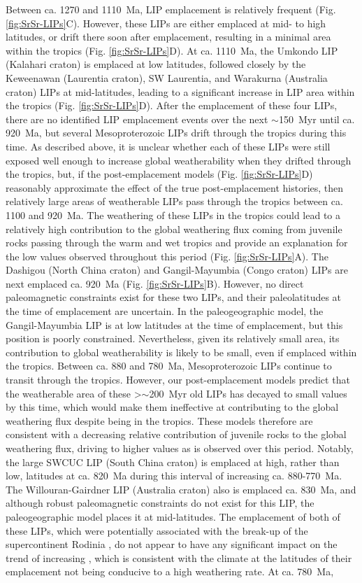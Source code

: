 Between ca. 1270 and 1110~Ma, LIP emplacement is relatively frequent (Fig. \ref{fig:SrSr-LIPs}C). However, these LIPs are either emplaced at mid- to high latitudes, or drift there soon after emplacement, resulting in a minimal area within the tropics (Fig. \ref{fig:SrSr-LIPs}D). At ca. 1110~Ma, the Umkondo LIP (Kalahari craton) is emplaced at low latitudes, followed closely by the Keweenawan (Laurentia craton), SW Laurentia, and Warakurna (Australia craton) LIPs at mid-latitudes, leading to a significant increase in LIP area within the tropics (Fig. \ref{fig:SrSr-LIPs}D). After the emplacement of these four LIPs, there are no identified LIP emplacement events over the next $\sim$150~Myr until ca. 920~Ma, but several Mesoproterozoic LIPs drift through the tropics during this time. As described above, it is unclear whether each of these LIPs were still exposed well enough to increase global weatherability when they drifted through the tropics, but, if the post-emplacement models (Fig. \ref{fig:SrSr-LIPs}D) reasonably approximate the effect of the true post-emplacement histories, then relatively large areas of weatherable LIPs pass through the tropics between ca. 1100 and 920~Ma. The weathering of these LIPs in the tropics could lead to a relatively high contribution to the global weathering flux coming from juvenile rocks passing through the warm and wet tropics and provide an explanation for the low \SrSr values observed throughout this period (Fig. \ref{fig:SrSr-LIPs}A). The Dashigou (North China craton) and Gangil-Mayumbia (Congo craton) LIPs are next emplaced ca. 920~Ma (Fig. \ref{fig:SrSr-LIPs}B). However, no direct paleomagnetic constraints exist for these two LIPs, and their paleolatitudes at the time of emplacement are uncertain. In the paleogeographic model, the Gangil-Mayumbia LIP is at low latitudes at the time of emplacement, but this position is poorly constrained. Nevertheless, given its relatively small area, its contribution to global weatherability is likely to be small, even if emplaced within the tropics. Between ca. 880 and 780~Ma, Mesoproterozoic LIPs continue to transit through the tropics. However, our post-emplacement models predict that the weatherable area of these \textgreater$\sim$200~Myr old LIPs has decayed to small values by this time, which would make them ineffective at contributing to the global weathering flux despite being in the tropics. These models therefore are consistent with a decreasing relative contribution of juvenile rocks to the global weathering flux, driving \SrSr to higher values as is observed over this period. Notably, the large SWCUC LIP (South China craton) is emplaced at high, rather than low, latitudes at ca. 820~Ma during this interval of increasing \SrSr ca. 880-770~Ma. The Willouran-Gairdner LIP (Australia craton) also is emplaced ca. 830~Ma, and although robust paleomagnetic constraints do not exist for this LIP, the paleogeographic model places it at mid-latitudes. The emplacement of both of these LIPs, which were potentially associated with the break-up of the supercontinent Rodinia \citep{Ernst2008a}, do not appear to have any significant impact on the trend of increasing \SrSr, which is consistent with the climate at the latitudes of their emplacement not being conducive to a high weathering rate. At ca. 780~Ma, 